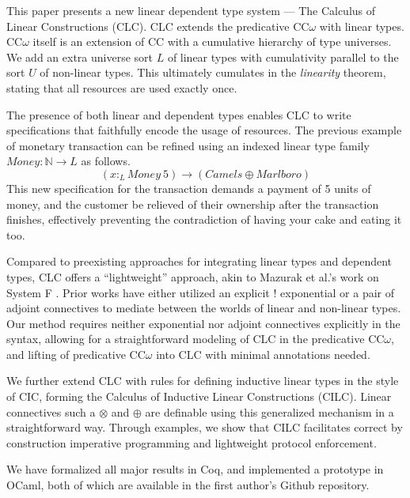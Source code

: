 \documentclass[sigplan,screen,review,authordraft]{acmart}
\newcommand{\ltype}{:_{\scriptscriptstyle L}}
\begin{document}
This paper presents a new linear dependent type system --- The Calculus of Linear Constructions (CLC). CLC extends the predicative CC$\omega$ with linear types. CC$\omega$ itself is an extension of CC with a cumulative hierarchy of type universes. We add an extra universe sort $L$ of linear types with cumulativity parallel to the sort $U$ of non-linear types. This ultimately cumulates in the \textit{linearity} theorem, stating that all resources are used exactly once.

The presence of both linear and dependent types enables CLC to write specifications that faithfully encode the usage of resources. The previous example of monetary transaction can be refined using an indexed linear type family $Money : \mathbb{N} \rightarrow L$ as follows.
\begin{equation*}
  (x \ltype Money\ 5) \rightarrow (Camels \oplus Marlboro)
\end{equation*}
This new specification for the transaction demands a payment of 5 units of money, and the customer be relieved of their ownership after the transaction finishes, effectively preventing the contradiction of having your cake and eating it too.

Compared to preexisting approaches for integrating linear types and dependent types, CLC offers a ``lightweight'' approach, akin to Mazurak et al.'s work on System F \cite{mazurak}. Prior works have either utilized an explicit ! exponential or a pair of adjoint connectives to mediate between the worlds of linear and non-linear types. Our method requires neither exponential nor adjoint connectives explicitly in the syntax, allowing for a straightforward modeling of CLC in the predicative CC$\omega$, and lifting of predicative CC$\omega$ into CLC with minimal annotations needed.

We further extend CLC with rules for defining inductive linear types in the style of CIC, forming the Calculus of Inductive Linear Constructions (CILC). Linear connectives such a $\otimes$ and $\oplus$ are definable using this generalized mechanism in a straightforward way. Through examples, we show that CILC facilitates correct by construction imperative programming and lightweight protocol enforcement.

We have formalized all major results in Coq, and implemented a prototype in OCaml, both of which are available in the first author's Github repository.
\end{document}
